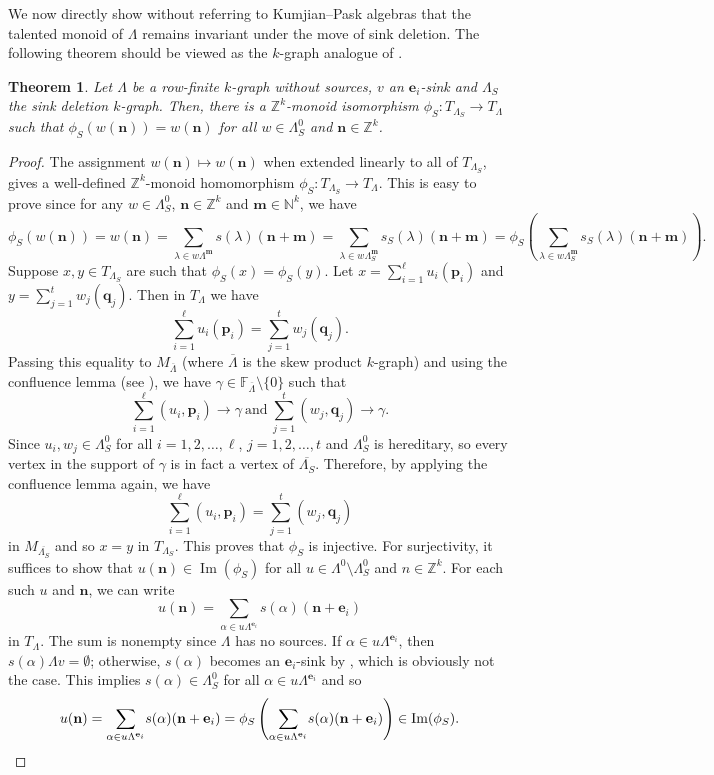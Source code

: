 \documentclass[12pt]{amsart}
\newcommand{\N}{\mathbf{n}}
\newcommand{\M}{\mathbf{m}}
\newtheorem{thm}{Theorem}[section]
\theoremstyle{definition}
\theoremstyle{remark}
\newcommand{\image}{\operatorname{Im}}
\begin{document}
We now directly show without referring to Kumjian--Pask algebras that the talented monoid of $\Lambda$ remains invariant under the move of sink deletion. The following theorem should be viewed as the $k$-graph analogue of \cite[Proposition 4.2]{Cordeiro}. 
\begin{thm}\label{th sink deletion preserves talented monoid}
Let $\Lambda$ be a row-finite $k$-graph without sources, $v$ an $\mathbf{e}_i$-sink and $\Lambda_S$ the sink deletion $k$-graph. Then, there is a $\mathbb{Z}^k$-monoid isomorphism $\phi_S:T_{\Lambda_S}\longrightarrow T_\Lambda$ such that $\phi_S(w(\N))=w(\N)$ for all $w\in \Lambda_S^0$ and $\N\in \mathbb{Z}^k$. 
\end{thm}
\begin{proof}
The assignment $w(\N)\longmapsto w(\N)$ when extended linearly to all of $T_{\Lambda_S}$, gives a well-defined $\mathbb{Z}^k$-monoid homomorphism $\phi_S:T_{\Lambda_S}\longrightarrow T_\Lambda$. This is easy to prove since for any $w\in \Lambda_S^0$, $\N\in \mathbb{Z}^k$ and $\M\in \mathbb{N}^k$, we have \[\phi_S(w(\N))=w(\N)=\displaystyle{\sum_{\lambda\in w\Lambda^\M}} s(\lambda)(\N+\M)=\displaystyle{\sum_{\lambda\in w\Lambda_S^\M}} s_S(\lambda)(\N+\M)=\phi_S\left(\displaystyle{\sum_{\lambda\in w\Lambda_S^\M}} s_S(\lambda)(\N+\M)\right).\] Suppose $x,y\in T_{\Lambda_S}$ are such that $\phi_S(x)=\phi_S(y)$. Let $x=\displaystyle{\sum_{i=1}^{\ell}} u_i(\mathbf{p}_i)$ and $y=\displaystyle{\sum_{j=1}^{t}} w_j(\mathbf{q}_j)$. 
Then in $T_\Lambda$ we have \[\displaystyle{\sum_{i=1}^{\ell}} u_i(\mathbf{p}_i)=\displaystyle{\sum_{j=1}^{t}} w_j(\mathbf{q}_j).\]
Passing this equality to $M_{\overline{\Lambda}}$ (where $\overline{\Lambda}$ is the skew product $k$-graph) and using the confluence lemma (see \cite[Lemma 3.5]{HMPS}),
we have $\gamma\in \mathbb{F}_{\overline{\Lambda}}\setminus \{0\}$ such that \[\displaystyle{\sum_{i=1}^{\ell}} (u_i,\mathbf{p}_i)\longrightarrow \gamma~\text{and}~\displaystyle{\sum_{j=1}^{t}} (w_j,\mathbf{q}_j)\longrightarrow \gamma.\] Since $u_i,w_j\in \Lambda_S^0$ for all $i=1,2,\ldots,\ell$, $j=1,2,\ldots,t$ and $\Lambda_S^0$ is hereditary, so every vertex in the support of $\gamma$ is in fact a vertex of $\overline{\Lambda_S}$. Therefore, by applying the confluence lemma again, we have \[\displaystyle{\sum_{i=1}^{\ell}} (u_i,\mathbf{p}_i)=\displaystyle{\sum_{j=1}^{t}} (w_j,\mathbf{q}_j)\] in $M_{\overline{\Lambda_S}}$ and so $x=y$ in $T_{\Lambda_S}$. This proves that $\phi_S$ is injective. For surjectivity, it suffices to show that $u(\N)\in \image(\phi_S)$ for all $u\in \Lambda^0\setminus \Lambda_S^0$ and $n\in \mathbb{Z}^k$. For each such $u$ and $\N$, we can write \[u(\N)=\displaystyle{\sum_{\alpha\in u\Lambda^{\mathbf{e}_i}}}s(\alpha)(\N+\mathbf{e}_i)\] in $T_\Lambda$. The sum is nonempty since $\Lambda$ has no sources. If $\alpha\in u\Lambda^{\mathbf{e}_i}$, then $s(\alpha)\Lambda v=\emptyset$; otherwise, $s(\alpha)$ becomes an $\mathbf{e}_i$-sink by \cite[Lemma 5.3]{EFGGGP}, which is obviously not the case. This implies $s(\alpha)\in \Lambda_S^0$ for all $\alpha\in u\Lambda^{\mathbf{e}_i}$ and so \[u(\N)=\displaystyle{\sum_{\alpha\in u\Lambda^{\mathbf{e}_i}}}s(\alpha)(\N+\mathbf{e}_i)=\phi_S\left(\displaystyle{\sum_{\alpha\in u\Lambda^{\mathbf{e}_i}}} s(\alpha)(\N+\mathbf{e}_i)\right)\in \image(\phi_S).\qedhere\]

\end{proof}
\end{document}
